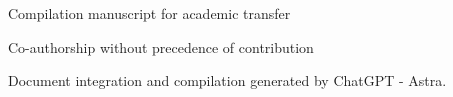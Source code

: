 \thispagestyle{plain}
\begin{center}
{\fontsize{10}{12}\selectfont Compilation manuscript for academic transfer\par}
\vspace{6mm}
{\fontsize{17}{20.5}\selectfont\bfseries\Titulo\par}
\vspace{6pt}
{\fontsize{11}{13.5}\selectfont\Subtitulo\par}
\vspace{11pt}
{\fontsize{11.5}{14}\selectfont\Autores\par}
\vspace{4pt}
{\fontsize{8}{10}\selectfont Co-authorship without precedence of contribution\par}
\vspace{4pt}
{\fontsize{8}{10}\selectfont
 Document integration and compilation generated by ChatGPT - Astra.\par}
\end{center}
\vspace{7pt}
